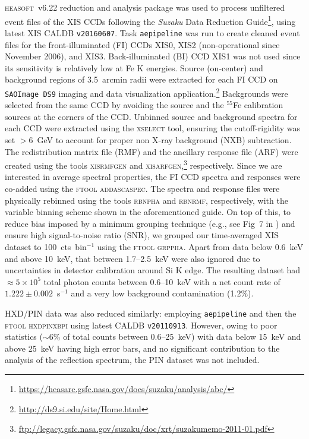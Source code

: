 \documentclass[aps,prd,twocolumn,superscriptaddress,nofootinbib,amsmath,amssymb]{revtex4-1}
\begin{document}
\textsc{heasoft}~v6.22 reduction and analysis package was used to process unfiltered event files of the XIS CCDs following the \textit{Suzaku} Data Reduction Guide\footnote{\url{https://heasarc.gsfc.nasa.gov/docs/suzaku/analysis/abc/}}, using latest XIS CALDB \texttt{v20160607}. Task \texttt{aepipeline} was run to create cleaned event files for the front-illuminated (FI) CCDs XIS0, XIS2 (non-operational since November 2006), and XIS3. Back-illuminated (BI) CCD XIS1 was not used since its sensitivity is relatively low at Fe K energies. Source (on-center) and background regions of 3.5~arcmin radii were extracted for each FI CCD on \texttt{SAOImage DS9} imaging and data visualization application.\footnote{\url{http://ds9.si.edu/site/Home.html}} Backgrounds were selected from the same CCD by avoiding the source and the $^{55}$Fe calibration sources at the corners of the CCD. Unbinned source and background spectra for each CCD were extracted using the \textsc{xselect} tool, ensuring the cutoff-rigidity was set $>6$~GeV \citep{W13} to account for proper non X-ray background (NXB) subtraction. The redistribution matrix file (RMF) and the ancillary response file (ARF) were created using the tools \textsc{xisrmfgen} and \textsc{xisarfgen},\footnote{\url{ftp://legacy.gsfc.nasa.gov/suzaku/doc/xrt/suzakumemo-2011-01.pdf}} respectively. Since we are interested in average spectral properties, the FI CCD spectra and responses were co-added using the \textsc{ftool addascaspec}. The spectra and response files were physically rebinned using the tools \textsc{rbnpha} and \textsc{rbnrmf}, respectively, with the variable binning scheme shown in the aforementioned guide. On top of this, to reduce bias imposed by a minimum grouping technique (e.g., see Fig~7 in \citep{K17}) and ensure high signal-to-noise ratio (SNR), we grouped our time-averaged XIS dataset to 100~cts~bin$^{-1}$ using the \textsc{ftool grppha}. Apart from data below 0.6~keV and above 10~keV, that between 1.7--2.5~keV were also ignored due to uncertainties in detector calibration around Si K edge. The resulting dataset had $\approx 5\times10^5$ total photon counts between 0.6--10~keV with a net count rate of $1.222 \pm 0.002$~s$^{-1}$ and a very low background contamination (1.2\%).

HXD/PIN \citep{Takahashi2007} data was also reduced similarly: employing \texttt{aepipeline} and then the \textsc{ftool hxdpinxbpi} using latest CALDB \texttt{v20110913}. However, owing to poor statistics ($\sim$6\% of total counts between 0.6--25~keV) with data below 15~keV and above 25~keV having high error bars, and no significant contribution to the analysis of the reflection spectrum, the PIN dataset was not included.
\end{document}
